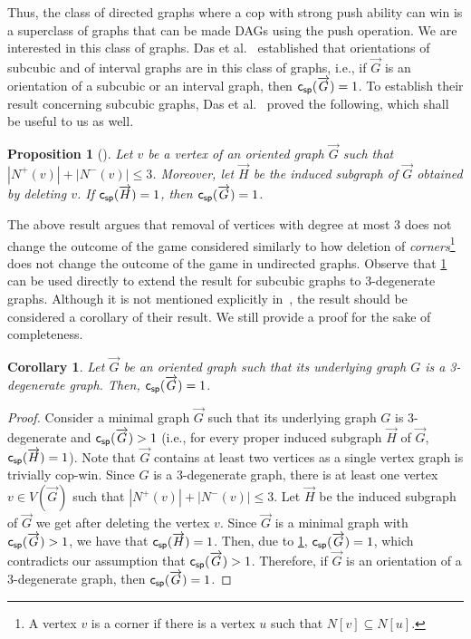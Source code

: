 \documentclass[a4paper,12pt]{amsart}
\newtheorem{corollary}[theorem]{Corollary}
\newtheorem{proposition}[theorem]{Proposition}
\newcommand{\csp}[1]{{\sf c_{sp}}(\overrightarrow{#1})}
\let\leq\leqslant
\begin{document}
Thus, the class of directed graphs where a cop with strong push ability can win is a superclass of graphs that can be made DAGs using the push operation. We are interested in this class of graphs. Das et al.~\cite{das2023cops} established that orientations of subcubic and of interval graphs are in this class of graphs, i.e., if $\overrightarrow{G}$ is an orientation of a subcubic or an interval graph, then $\csp{G} = 1$. To establish their result concerning subcubic graphs, Das et al.~\cite{das2023cops} proved the following, which shall be useful to us as well. 


\begin{proposition}[\cite{das2023cops}]\label{P:degenerate}
   Let $v$ be a vertex of an oriented graph $\overrightarrow{G}$ such that $|N^+(v)|+|N^-(v)| \leq 3$. Moreover, let $\overrightarrow{H}$ be the induced subgraph of $\overrightarrow{G}$ obtained by deleting $v$. If $\csp{H} =1$, then $\csp{G}=1$.
\end{proposition}

The above result argues that removal of vertices with degree at most $3$ does not change the outcome of the game considered similarly to how deletion of \textit{corners}\footnote{A vertex $v$ is a corner if there is a vertex $u$ such that $N[v]\subseteq N[u]$.} does not change the outcome of the game in undirected graphs.  Observe that \cref{P:degenerate} can be used directly to extend the result for subcubic graphs to 3-degenerate graphs. Although it is not mentioned explicitly in~\cite{das2023cops}, the result should be considered a corollary of their result. We still provide a proof for the sake of completeness.
\begin{corollary}\label{T:3-degenrate}
    Let $\overrightarrow{G}$ be an oriented graph such that its underlying graph $G$ is a 3-degenerate graph. Then, $\csp{G} = 1$.
\end{corollary}
\begin{proof}
Consider a minimal graph $ \overrightarrow{G}$ such that its underlying graph $G$ is 3-degenerate and $\csp{G}>1$ (i.e., for every proper induced subgraph $\overrightarrow{H}$ of $\overrightarrow{G}$,  $\csp{H} = 1$). Note that $\overrightarrow{G}$ contains at least two vertices as a single vertex graph is trivially cop-win.  Since $G$ is a 3-degenerate graph, there is at least one vertex $v\in V(\overrightarrow{G})$ such that $|N^+(v)|+|N^-(v)| \leq 3$. Let $\overrightarrow{H}$ be the induced subgraph of $\overrightarrow{G}$ we get after deleting the vertex $v$. Since $\overrightarrow{G}$ is a minimal graph with $\csp{G}>1$, we have that $\csp{H} = 1$. Then, due to \cref{P:degenerate}, $\csp{G} =1$, which contradicts our assumption that $\csp{G}>1$. 
Therefore, if $\overrightarrow{G}$ is an orientation  of a 3-degenerate  graph, then $\csp{G} =1$.
\end{proof} 
\end{document}

